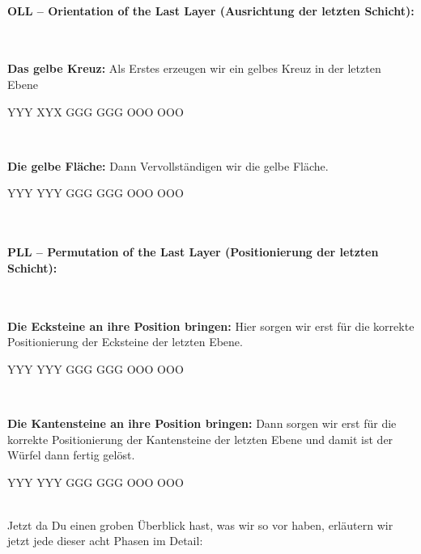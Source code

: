 \paragraph{OLL -- Orientation of the Last Layer (Ausrichtung der letzten Schicht):}\hfill\\[1em]
\parbox{0.7\linewidth}{
  \textbf{Das gelbe Kreuz:} Als Erstes erzeugen wir ein gelbes Kreuz in der letzten Ebene
}\parbox{0.3\linewidth}{
\centering
\RubikCubeGreyAll%
            {Y}{Y}{Y}
            {X}{Y}{X}%
	       {G}{G}{G}
	       {G}{G}{G}%
	       {O}{O}{O}
	       {O}{O}{O}%
}\\[1em]
\parbox{0.7\linewidth}{
  \textbf{Die gelbe Fläche:} Dann Vervollständigen wir die gelbe Fläche.
}\parbox{0.3\linewidth}{
\centering
\RubikCubeGreyAll%
            {Y}{Y}{Y}
            {Y}{Y}{Y}%
	       {G}{G}{G}
	       {G}{G}{G}%
	       {O}{O}{O}
	       {O}{O}{O}%
}\\[1em]
\paragraph{PLL -- Permutation of the Last Layer (Positionierung der letzten Schicht):}\hfill\\[1em]
\parbox{0.7\linewidth}{
  \textbf{Die Ecksteine an ihre Position bringen:} Hier sorgen wir erst für die korrekte Positionierung der Ecksteine der letzten Ebene.
}\parbox{0.3\linewidth}{
\centering
\RubikCubeGreyAll%
            {Y}{Y}{Y}
            {Y}{Y}{Y}%
	       {G}{G}{G}
	       {G}{G}{G}%
	       {O}{O}{O}
	       {O}{O}{O}%
}\\[1em]
\parbox{0.7\linewidth}{
  \textbf{Die Kantensteine an ihre Position bringen:} Dann sorgen wir erst für die korrekte Positionierung der Kantensteine der letzten Ebene und damit ist der Würfel dann fertig gelöst.
}\parbox{0.3\linewidth}{
\centering
\RubikCubeGreyAll%
            {Y}{Y}{Y}
            {Y}{Y}{Y}%
	       {G}{G}{G}
	       {G}{G}{G}%
	       {O}{O}{O}
	       {O}{O}{O}%
}\\[1em]


Jetzt da Du einen groben Überblick hast, was wir so vor haben, erläutern wir jetzt jede dieser acht Phasen im Detail:
